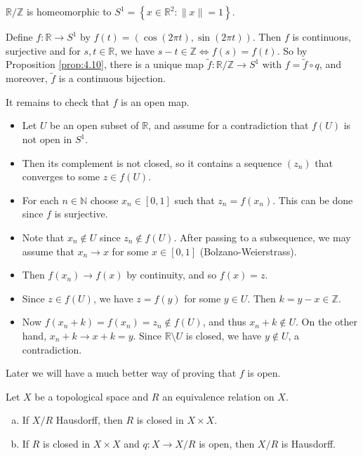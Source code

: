\documentclass[a4paper]{article}
\begin{document}
\begin{example}
    $\mathbb{R} / \mathbb{Z}$ is homeomorphic to $S^{1}=\left\{x \in \mathbb{R}^{2}:\|x\|=1\right\}$.

    Define $f: \mathbb{R} \rightarrow S^{1}$ by $f(t)=(\cos (2 \pi t), \sin (2 \pi t))$. Then $f$ is continuous, surjective and for $s, t \in \mathbb{R}$, we have $s-t \in \mathbb{Z} \Longleftrightarrow f(s)=f(t)$. So by Proposition \ref{prop:4.10}, there is a unique map $\tilde{f}: \mathbb{R} / \mathbb{Z} \rightarrow S^{1}$ with $f=\tilde{f} \circ q$, and moreover, $\tilde{f}$ is a continuous bijection.

    It remains to check that $f$ is an open map. 
    \begin{itemize}
        \item Let $U$ be an open subset of $\mathbb{R}$, and assume for a contradiction that $f(U)$ is not open in $S^{1}$. 
        \item Then its complement is not closed, so it contains a sequence $\left(z_{n}\right)$ that converges to some $z \in f(U)$. 
        \item For each $n \in \mathbb{N}$ choose $x_{n} \in[0,1]$ such that $z_{n}=f\left(x_{n}\right)$. This can be done since $f$ is surjective.  
        \item Note that $x_{n} \notin U$ since $z_{n} \notin f(U)$. After passing to a subsequence, we may assume that $x_{n} \rightarrow x$ for some $x \in[0,1]$ (Bolzano-Weierstrass). 
        \item Then $f\left(x_{n}\right) \rightarrow f(x)$ by continuity, and so $f(x)=z$. 
        \item Since $z \in f(U)$, we have $z=f(y)$ for some $y \in U$. Then $k=y-x \in \mathbb{Z}$. 
        \item Now $f\left(x_{n}+k\right)=f\left(x_{n}\right)=z_{n} \notin f(U)$, and thus $x_{n}+k \notin U$. On the other hand, $x_{n}+k \rightarrow x+k=y$. Since $\mathbb{R} \setminus U$ is closed, we have $y \notin U$, a contradiction.
    \end{itemize}

    Later we will have a much better way of proving that $f$ is open.
\end{example}

\begin{proposition}
    Let $X$ be a topological space and $R$ an equivalence relation on $X$.
    \begin{enumerate}[(a)]
        \item If $X / R$ Hausdorff, then $R$ is closed in $X \times X$.
        \item If $R$ is closed in $X \times X$ and $q: X \rightarrow X / R$ is open, then $X / R$ is Hausdorff.
    \end{enumerate}
\end{proposition}
\end{document}
